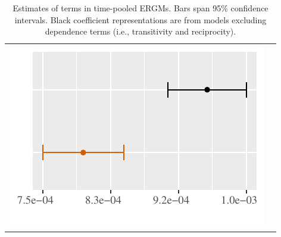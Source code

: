\documentclass[reqno,onecolumn,letterpaper,12pt]{article}
\begin{document}
\begin{longtable}[!h]{c@{\hskip 0cm}c}
\includegraphics[height=.18\textheight, clip=true, trim=0cm 0cm 0cm .2cm]{draft_figures/plots_pooled/Trade_out.pdf}   \\

\caption{\label{fig:effectPlots2} Estimates of terms in time-pooled ERGMs. Bars span 95\% confidence intervals. Black coefficient representations are from models excluding dependence terms (i.e., transitivity and reciprocity).}

\end{longtable}
\end{document}
